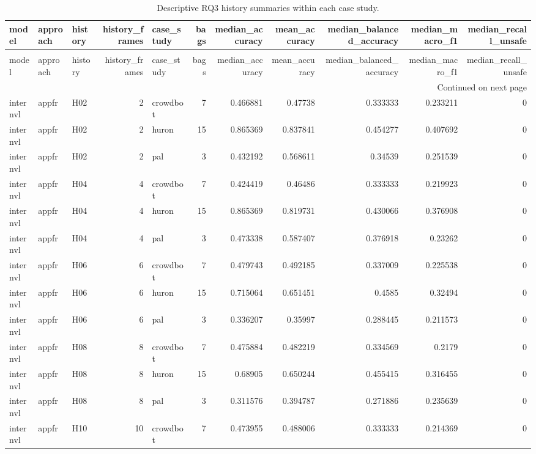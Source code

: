 \begin{longtable}{lllrlrrrrrr}
\caption{Descriptive RQ3 history summaries within each case study.} \label{tab:rq3-case-study-history-summary} \\
\toprule
model & approach & history & history\_frames & case\_study & bags & median\_accuracy & mean\_accuracy & median\_balanced\_accuracy & median\_macro\_f1 & median\_recall\_unsafe \\
\midrule
\endfirsthead
\caption[]{Descriptive RQ3 history summaries within each case study.} \\
\toprule
model & approach & history & history\_frames & case\_study & bags & median\_accuracy & mean\_accuracy & median\_balanced\_accuracy & median\_macro\_f1 & median\_recall\_unsafe \\
\midrule
\endhead
\midrule
\multicolumn{11}{r}{Continued on next page} \\
\midrule
\endfoot
\bottomrule
\endlastfoot
internvl & appfr & H02 & 2 & crowdbot & 7 & 0.466881 & 0.47738 & 0.333333 & 0.233211 & 0 \\
internvl & appfr & H02 & 2 & huron & 15 & 0.865369 & 0.837841 & 0.454277 & 0.407692 & 0 \\
internvl & appfr & H02 & 2 & pal & 3 & 0.432192 & 0.568611 & 0.34539 & 0.251539 & 0 \\
internvl & appfr & H04 & 4 & crowdbot & 7 & 0.424419 & 0.46486 & 0.333333 & 0.219923 & 0 \\
internvl & appfr & H04 & 4 & huron & 15 & 0.865369 & 0.819731 & 0.430066 & 0.376908 & 0 \\
internvl & appfr & H04 & 4 & pal & 3 & 0.473338 & 0.587407 & 0.376918 & 0.23262 & 0 \\
internvl & appfr & H06 & 6 & crowdbot & 7 & 0.479743 & 0.492185 & 0.337009 & 0.225538 & 0 \\
internvl & appfr & H06 & 6 & huron & 15 & 0.715064 & 0.651451 & 0.4585 & 0.32494 & 0 \\
internvl & appfr & H06 & 6 & pal & 3 & 0.336207 & 0.35997 & 0.288445 & 0.211573 & 0 \\
internvl & appfr & H08 & 8 & crowdbot & 7 & 0.475884 & 0.482219 & 0.334569 & 0.2179 & 0 \\
internvl & appfr & H08 & 8 & huron & 15 & 0.68905 & 0.650244 & 0.455415 & 0.316455 & 0 \\
internvl & appfr & H08 & 8 & pal & 3 & 0.311576 & 0.394787 & 0.271886 & 0.235639 & 0 \\
internvl & appfr & H10 & 10 & crowdbot & 7 & 0.473955 & 0.488006 & 0.333333 & 0.214369 & 0 \\

\end{longtable}
